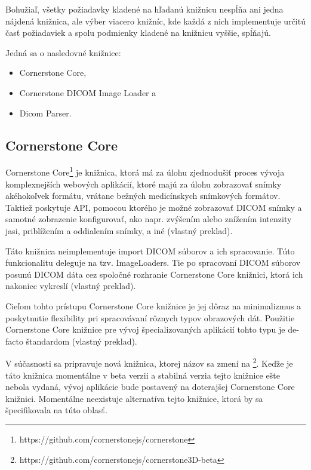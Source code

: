Bohužiaľ, všetky požiadavky kladené na hľadanú knižnicu nespĺňa ani jedna nájdená knižnica, ale výber viacero knižníc, kde každá z nich implementuje určitú časť požiadaviek a spolu podmienky kladené na knižnicu vyššie, spĺňajú.

Jedná sa o nasledovné knižnice:
\begin {itemize}
\item {Cornerstone Core,}
\item {Cornerstone DICOM Image Loader a}
\item {Dicom Parser.}
\end {itemize}

\subsection {Cornerstone Core}
Cornerstone Core\footnote{https://github.com/cornerstonejs/cornerstone} je knižnica, ktorá má za úlohu zjednodušiť proces vývoja komplexnejších webových aplikácií, ktoré majú za úlohu zobrazovať snímky akéhokoľvek formátu, vrátane bežných medicínskych snímkových formátov. Taktiež poskytuje API, pomocou ktorého je možné zobrazovať DICOM snímky a samotné zobrazenie konfigurovať, ako napr. zvýšením alebo znížením intenzity jasi, priblížením a oddialením snímky, a iné \cite{about_cornerstone_core} (vlastný preklad).

Táto knižnica neimplementuje import DICOM súborov a ich spracovanie. Túto funkcionalitu deleguje na tzv. ImageLoaders. Tie po spracovaní DICOM súborov posunú DICOM dáta cez spoločné rozhranie Cornerstone Core knižnici, ktorá ich nakoniec vykreslí \cite{about_cornerstone_core} (vlastný preklad).

Cieľom tohto prístupu Cornerstone Core knižnice je jej dôraz na minimalizmus a poskytnutie flexibility pri spracovávaní rôznych typov obrazových dát. Použitie Cornerstone Core knižnice pre vývoj špecializovaných aplikácií tohto typu je de-facto štandardom \cite{about_cornerstone_core} (vlastný preklad).

V súčasnosti sa pripravuje nová  knižnica, ktorej názov sa zmení na \footnote{https://github.com/cornerstonejs/cornerstone3D-beta}. Keďže je táto knižnica momentálne v beta verzii a stabilná verzia tejto knižnice ešte nebola vydaná, vývoj aplikácie bude postavený na doterajšej Cornerstone Core knižnici.
Momentálne neexistuje alternatíva tejto knižnice, ktorá by sa špecifikovala na túto oblasť.

